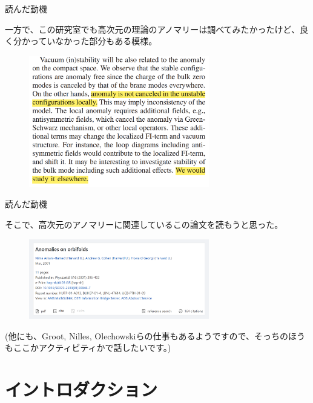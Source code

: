 \documentclass[
  unicode,a4paper,10pt,
  xcolor = {dvipsnames,svgnames},
  hyperref ={colorlinks=true,citecolor=Navy,linkcolor=NavyBlue,urlcolor=purple},
  ja=standard,lualatex
]{beamer}
\begin{document}
\begin{frame}{読んだ動機}

  一方で、この研究室でも高次元の理論のアノマリーは調べてみたかったけど、良く分かっていなかった部分もある模様。
  \begin{figure}[ht]
    \centering
    \includegraphics[width=0.7\textwidth]{fig/Abe2020vmv.png}
    \cite{Abe:2020vmv}    
  \end{figure}

\end{frame}


\begin{frame}{読んだ動機}

  そこで、高次元のアノマリーに関連しているこの論文を読もうと思った。
  \begin{figure}[ht]
    \centering
    \includegraphics[width=0.7\textwidth]{fig/Arkani-Hamed2001uol.png}
  \end{figure}

  (他にも、Groot, Nilles, Olechowskiらの仕事もあるようですので、そっちのほうもここかアクティビティかで話したいです。)

\end{frame}


\section{イントロダクション}

\begin{frame}
  \huge \secname
\end{frame}
\end{document}
